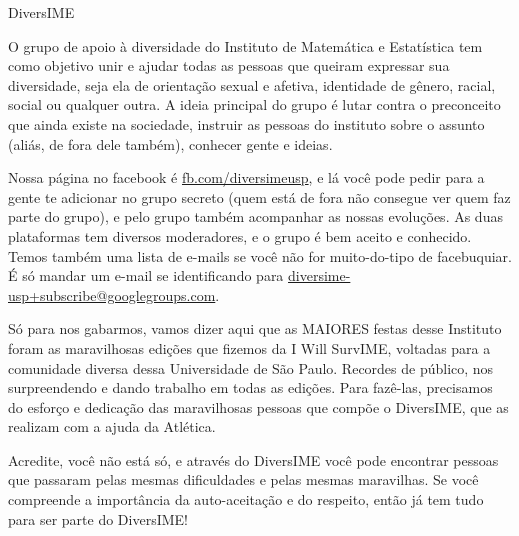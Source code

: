 \begin{subsecao}{DiversIME}


O grupo de apoio à diversidade do Instituto de Matemática e Estatística tem como
objetivo unir e ajudar todas as pessoas que queiram expressar sua diversidade,
seja ela de orientação sexual e afetiva, identidade de gênero, racial, social ou
qualquer outra. A ideia principal do grupo é lutar contra o preconceito que
ainda existe na sociedade, instruir as pessoas do instituto sobre o assunto
(aliás, de fora dele também), conhecer gente e ideias.

Nossa página no facebook é \url{fb.com/diversimeusp}, e lá você pode pedir para
a gente te adicionar no grupo secreto (quem está de fora não consegue ver quem
faz parte do grupo), e pelo grupo também acompanhar as nossas evoluções. As duas
plataformas tem diversos moderadores, e o grupo é bem aceito e conhecido. Temos
também uma lista de e-mails se você não for muito-do-tipo de facebuquiar. É só
mandar um e-mail se identificando para
\url{diversime-usp+subscribe@googlegroups.com}.

Só para nos gabarmos, vamos dizer aqui que as MAIORES festas desse Instituto
foram as maravilhosas edições que fizemos da I Will SurvIME, voltadas para a
comunidade diversa dessa Universidade de São Paulo. Recordes de público, nos
surpreendendo e dando trabalho em todas as edições. Para fazê-las, precisamos
do esforço e dedicação das maravilhosas pessoas que compõe o DiversIME, que
as realizam com a ajuda da Atlética.

Acredite, você não está só, e através do DiversIME você pode encontrar pessoas
que passaram pelas mesmas dificuldades e pelas mesmas maravilhas. Se você
compreende a importância da auto-aceitação e do respeito, então já tem tudo para
ser parte do DiversIME!

\end{subsecao}
